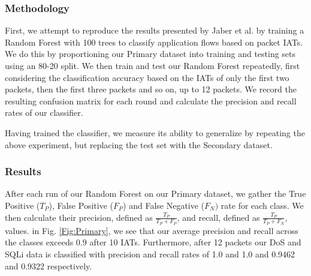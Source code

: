 \subsubsection*{Methodology}

\label{Sec:exp2_method}
First, we attempt to reproduce the results presented by Jaber et al. \cite{jaber2011can} by training a Random Forest with 100 trees to classify application flows based on packet IATs. We do this by proportioning our Primary dataset into training and testing sets using an 80-20 split. We then train and test our Random Forest repeatedly, first considering the classification accuracy based on the IATs of only the first two packets, then the first three packets and so on, up to 12 packets. We record the resulting confusion matrix for each round and calculate the precision and recall rates of our classifier.

Having trained the classifier, we measure its ability to generalize by repeating the above experiment, but replacing the test set with the Secondary dataset.


\subsubsection*{Results}


 After each run of our Random Forest on our Primary dataset, we gather the True Positive ($T_{P}$), False Positive ($F_{P}$) and False Negative ($F_{N})$ rate for each class. We then calculate their precision, defined as $ \frac{T_P}{T_P + F_P}$, and recall, defined as $ \frac{T_P}{T_P + F_N}$, values. in Fig. \ref{Fig:Primary}, we see that our average precision and recall across the classes exceeds 0.9 after 10 IATs. Furthermore, after 12 packets our DoS and SQLi data is classified with precision and recall rates of 1.0 and 1.0 and 0.9462 and 0.9322 respectively.

